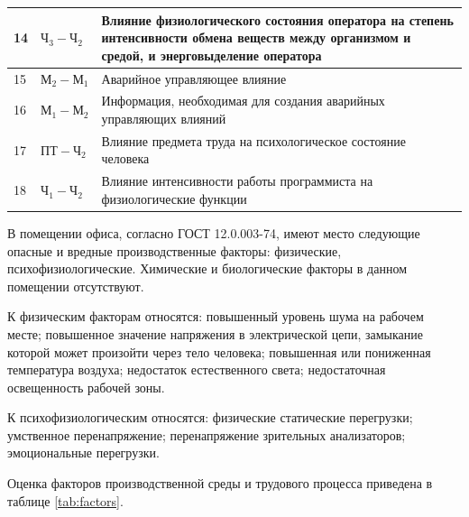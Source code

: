 {\begin{center}
\begin{longtable}{|p{1cm}|p{3cm}|p{12cm}|}
       \hline
       14 & \(\text{Ч}_3-\text{Ч}_2\) & Влияние физиологического состояния оператора на степень интенсивности обмена веществ
                                        между организмом и средой, и энерговыделение оператора \\
       \hline
       15 & \(\text{М}_2-\text{М}_1\) & Аварийное управляющее влияние \\
       \hline
       16 & \(\text{М}_1-\text{М}_2\) & Информация, необходимая для создания аварийных управляющих влияний \\
       \hline
       17 & \(\text{ПТ}-\text{Ч}_2 \) & Влияние предмета труда на психологическое состояние человека \\
       \hline
       18 & \(\text{Ч}_1-\text{Ч}_2\) & Влияние интенсивности работы программиста на физиологические функции \\
       \hline
   \end{longtable}
\end{center}
}

В помещении офиса, согласно ГОСТ 12.0.003-74, имеют место следующие опасные и вредные производственные факторы:
физические, психофизиологические. Химические и биологические факторы в данном помещении отсутствуют. 

К физическим факторам относятся: повышенный уровень шума на рабочем месте;
повышенное значение напряжения в электрической цепи, замыкание которой может
произойти через тело человека; повышенная или пониженная температура воздуха;
недостаток естественного света; недостаточная освещенность рабочей зоны. 

К психофизиологическим относятся: физические статические перегрузки; умственное перенапряжение; 
перенапряжение зрительных анализаторов; эмоциональные перегрузки.

Оценка факторов производственной среды и трудового процесса приведена в таблице \ref{tab:factors}.	

